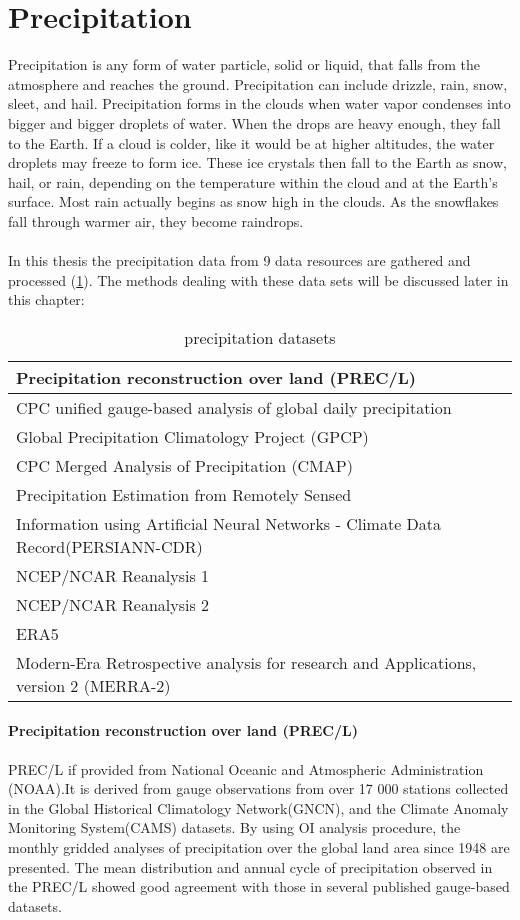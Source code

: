 \section{Precipitation}
Precipitation is any form of water particle, solid or liquid, that falls from the atmosphere and reaches the ground. Precipitation can include drizzle, rain, snow, sleet, and hail. Precipitation forms in the clouds when water vapor condenses into bigger and bigger droplets of water. When the drops are heavy enough, they fall to the Earth. If a cloud is colder, like it would be at higher altitudes, the water droplets may freeze to form ice. These ice crystals then fall to the Earth as snow, hail, or rain, depending on the temperature within the cloud and at the Earth's surface. Most rain actually begins as snow high in the clouds. As the snowflakes fall through warmer air, they become raindrops. \\\\
In this thesis the precipitation data from 9 data resources are gathered and processed (\ref{tab:pre}). The methods dealing with these data sets will be discussed later in this chapter:
\begin{table}[htbp]\centering
	\begin{tabular}{|l|}
		\hline
	Precipitation reconstruction over land (PREC/L)	\\ \hline
	CPC unified gauge-based analysis of global daily precipitation	\\ \hline
	Global Precipitation Climatology Project (GPCP)	\\ \hline
	CPC Merged Analysis of Precipitation (CMAP)	\\ \hline
	Precipitation Estimation from Remotely Sensed \\
	Information using Artificial Neural Networks - Climate Data Record(PERSIANN-CDR)	\\ \hline
	NCEP/NCAR Reanalysis 1	\\ \hline
	NCEP/NCAR Reanalysis 2	\\ \hline
	ERA5	\\ \hline
	Modern-Era Retrospective analysis for research and Applications, version 2 (MERRA-2)	\\ \hline
	\end{tabular}
	\label{tab:pre}
	\caption{precipitation datasets}
\end{table}
\paragraph{Precipitation reconstruction over land (PREC/L)}
PREC/L if provided from National Oceanic and Atmospheric Administration (NOAA).It is derived from gauge observations from over 17 000 stations collected in the Global Historical Climatology Network(GNCN), and the Climate Anomaly Monitoring System(CAMS) datasets. By using OI analysis procedure, the monthly gridded analyses of precipitation over the global land area since 1948 are presented. The mean distribution and annual cycle of precipitation observed in the PREC/L showed good agreement with those in several published gauge-based datasets. \cite{chen2002global}

